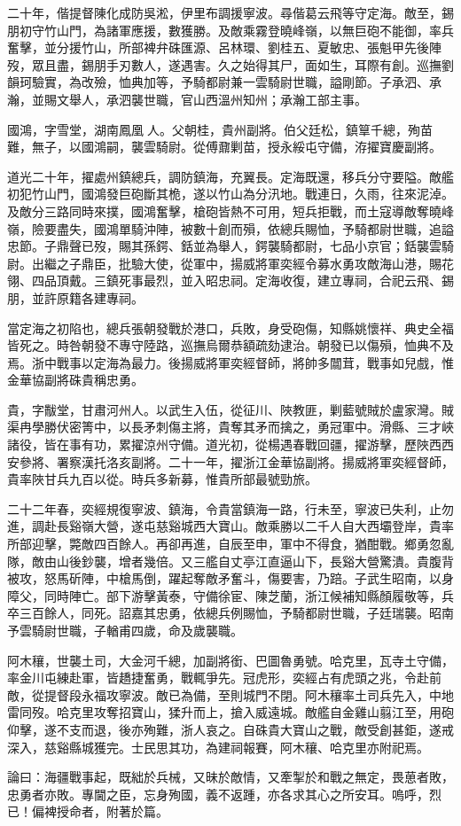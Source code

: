 \begin{pinyinscope}
二十年，偕提督陳化成防吳淞，伊里布調援寧波。尋偕葛云飛等守定海。敵至，錫朋初守竹山門，為諸軍應援，數獲勝。及敵乘霧登曉峰嶺，以無巨砲不能御，率兵奮擊，並分援竹山，所部裨弁硃匯源、呂林環、劉桂五、夏敏忠、張魁甲先後陣歿，眾且盡，錫朋手刃數人，遂遇害。久之始得其尸，面如生，耳際有創。巡撫劉韻珂驗實，為改殮，恤典加等，予騎都尉兼一雲騎尉世職，謚剛節。子承泗、承瀚，並賜文舉人，承泗襲世職，官山西溫州知州；承瀚工部主事。

國鴻，字雪堂，湖南鳳凰人。父朝桂，貴州副將。伯父廷松，鎮筸千總，殉苗難，無子，以國鴻嗣，襲雲騎尉。從傅鼐剿苗，授永綏屯守備，洊擢寶慶副將。

道光二十年，擢處州鎮總兵，調防鎮海，充翼長。定海既還，移兵分守要隘。敵艦初犯竹山門，國鴻發巨砲斷其桅，遂以竹山為分汛地。戰連日，久雨，往來泥淖。及敵分三路同時來撲，國鴻奮擊，槍砲皆熱不可用，短兵拒戰，而土寇導敵奪曉峰嶺，險要盡失，國鴻單騎沖陣，被數十創而殞，依總兵賜恤，予騎都尉世職，追謚忠節。子鼎聲已歿，賜其孫鍔、銛並為舉人，鍔襲騎都尉，七品小京官；銛襲雲騎尉。出繼之子鼎臣，批驗大使，從軍中，揚威將軍奕經令募水勇攻敵海山港，賜花翎、四品頂戴。三鎮死事最烈，並入昭忠祠。定海收復，建立專祠，合祀云飛、錫朋，並許原籍各建專祠。

當定海之初陷也，總兵張朝發戰於港口，兵敗，身受砲傷，知縣姚懷祥、典史全福皆死之。時咎朝發不專守陸路，巡撫烏爾恭額疏劾逮治。朝發已以傷殞，恤典不及焉。浙中戰事以定海為最力。後揚威將軍奕經督師，將帥多闒茸，戰事如兒戲，惟金華協副將硃貴稱忠勇。

貴，字黻堂，甘肅河州人。以武生入伍，從征川、陜教匪，剿藍號賊於盧家灣。賊渠冉學勝伏密箐中，以長矛刺傷主將，貴奪其矛而擒之，勇冠軍中。滑縣、三才峽諸役，皆在事有功，累擢涼州守備。道光初，從楊遇春戰回疆，擢游擊，歷陜西西安參將、署察漢托洛亥副將。二十一年，擢浙江金華協副將。揚威將軍奕經督師，貴率陜甘兵九百以從。時兵多新募，惟貴所部最號勁旅。

二十二年春，奕經規復寧波、鎮海，令貴當鎮海一路，行未至，寧波已失利，止勿進，調赴長谿嶺大營，遂屯慈谿城西大寶山。敵乘勝以二千人自大西壩登岸，貴率所部迎擊，斃敵四百餘人。再卻再進，自辰至申，軍中不得食，猶酣戰。鄉勇忽亂隊，敵由山後鈔襲，增者幾倍。又三艦自丈亭江直逼山下，長谿大營驚潰。貴腹背被攻，怒馬斫陣，中槍馬倒，躍起奪敵矛奮斗，傷要害，乃踣。子武生昭南，以身障父，同時陣亡。部下游擊黃泰，守備徐宦、陳芝蘭，浙江候補知縣顏履敬等，兵卒三百餘人，同死。詔嘉其忠勇，依總兵例賜恤，予騎都尉世職，子廷瑞襲。昭南予雲騎尉世職，子輶甫四歲，命及歲襲職。

阿木穰，世襲土司，大金河千總，加副將銜、巴圖魯勇號。哈克里，瓦寺土守備，率金川屯練赴軍，皆趫捷奮勇，戰輒爭先。冠虎形，奕經占有虎頭之兆，令赴前敵，從提督段永福攻寧波。敵已為備，至則城門不閉。阿木穰率土司兵先入，中地雷同歿。哈克里攻奪招寶山，猱升而上，搶入威遠城。敵艦自金雞山翦江至，用砲仰擊，遂不支而退，後亦殉難，浙人哀之。自硃貴大寶山之戰，敵受創甚鉅，遂戒深入，慈谿縣城獲完。士民思其功，為建祠報賽，阿木穰、哈克里亦附祀焉。

論曰：海疆戰事起，既絀於兵械，又昧於敵情，又牽掣於和戰之無定，畏葸者敗，忠勇者亦敗。專閫之臣，忘身殉國，義不返踵，亦各求其心之所安耳。嗚呼，烈已！偏裨授命者，附著於篇。


\end{pinyinscope}